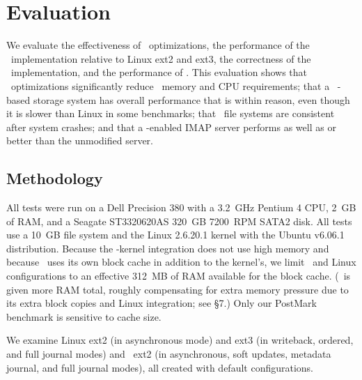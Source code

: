 
\section {Evaluation}
\label{sec:evaluation}
\label{eval}

We evaluate
%
the effectiveness of \patch\ optimizations,
%
the performance of the \Kudos\ implementation relative to Linux ext2
and ext3,
%
the correctness of the \Kudos\ implementation,
%
and the performance of \patchgroups.
%
This evaluation shows
%
that \patch\ optimizations significantly reduce \patch\ memory and CPU
requirements;
%
that a \Kudos\ \patch-based storage system has overall performance
that is within reason, even though it is slower than Linux in some
benchmarks;
%
that \Kudos\ file systems are consistent after system crashes;
%
and that a \patchgroup-enabled IMAP server performs as well as or
better than the unmodified server.

\subsection{Methodology}

All tests were run on a Dell Precision 380 with a 3.2~GHz Pentium 4
CPU, 2~GB of RAM, and a Seagate ST3320620AS 320~GB 7200~RPM SATA2 disk.
%
All tests use a 10~GB file system and the Linux 2.6.20.1 kernel
with the Ubuntu v6.06.1 distribution.
%
Because the \Kudos-kernel integration does not use high memory and
because \Kudos\ uses its own block cache in addition to the kernel's,
we limit \Kudos\ and Linux configurations to an effective 312~MB of
RAM available for the block cache.
%
(\Kudos\ is given more RAM total, roughly compensating for extra memory
pressure due to its extra block copies and Linux integration; see \S7.)
%
Only our PostMark benchmark is sensitive to cache size.


We examine Linux ext2 (in asynchronous mode) and ext3 (in writeback,
ordered, and full journal modes) and \Kudos\ ext2 (in asynchronous,
soft updates, metadata journal, and full journal modes), all created
with default configurations.

